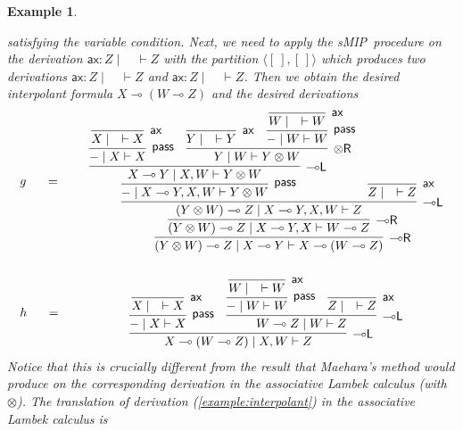 \documentclass[sn-mathphys-num]{sn-jnl}%
\newcommand{\vd}{\vdash}
\newcommand{\tr}{\otimes\mathsf{R}}
\newcommand{\pass}{\mathsf{pass}}
\newcommand{\ax}{\mathsf{ax}}
\newcommand{\ot}{\otimes}
\newcommand{\lolli}{\multimap}
\newcommand{\lleft}{{\lolli}\mathsf{L}}
\newcommand{\lright}{{\lolli}\mathsf{R}}
\newcommand{\sMIP}{\textsf{sMIP}}
\theoremstyle{thmstyleone}%
\theoremstyle{thmstyletwo}%
\newtheorem{example}[theorem]{Example}%
\theoremstyle{thmstylethree}%
\begin{document}
\begin{example}
\begin{itemize}
  \end{itemize}
  satisfying the variable condition.
  Next, we need to apply the \sMIP~procedure on the derivation $\ax : Z \mid \quad \vd Z$ with the partition $\langle [\ ] , [\ ] \rangle$ which produces two derivations $\ax : Z \mid \quad \vd Z$ and $\ax : Z \mid \quad \vd Z$.
  Then we obtain the desired interpolant formula $X \lolli (W \lolli Z)$ and the desired derivations 
  \begin{displaymath}
    \begin{array}{lc}
      \begin{array}{c}
        g
      \end{array}
      \quad
      =&
      \quad
      \begin{array}{c}
        \infer[\lright]{(Y \ot W) \lolli Z \mid X \lolli Y \vd X \lolli (W \lolli Z)}{
        \infer[\lright]{(Y \ot W) \lolli Z \mid X \lolli Y , X\vd W \lolli Z}{
        \infer[\lleft]{(Y \ot W) \lolli Z \mid X \lolli Y , X , W \vd Z}{
        \infer[\pass]{{-} \mid X \lolli Y , X , W\vd Y \ot W}{
        \infer[\lleft]{X \lolli Y \mid X , W \vd Y \ot W}{
        \infer[\pass]{{-} \mid X \vd X}{
        \infer[\ax]{X \mid \quad \vd X}{}
        }
        &
        \infer[\tr]{Y \mid W \vd Y \ot W}{
        \infer[\ax]{Y \mid \quad \vd Y}{}
        &
        \infer[\pass]{{-} \mid W \vd W}{
        \infer[\ax]{W \mid \quad \vd W}{}
        }
        }
        }
        }
        &
        \infer[\ax]{Z \mid \quad \vd Z}{}
        }
        }
        }
      \end{array}
      \\[2.5cm]
      \begin{array}{c}
        h
      \end{array}
      \quad
      =&
      \quad
      \begin{array}{c}
        \infer[\lleft]{X \lolli (W \lolli Z) \mid X, W \vd Z}{
        \infer[\pass]{{-} \mid X \vd X}{
        \infer[\ax]{X \mid \quad \vd X}{}
        }
        &
        \infer[\lleft]{W \lolli Z \mid W \vd Z}{
        \infer[\pass]{{-} \mid W \vd W}{
        \infer[\ax]{W \mid \quad \vd W}{}
        }
        &
        \infer[\ax]{Z \mid \quad \vd Z}{}
        }
        }
      \end{array}
    \end{array}
  \end{displaymath}
  Notice that this is crucially different from the result that Maehara's method would produce on the corresponding derivation in the associative Lambek calculus (with $\ot$). The translation of derivation (\ref{example:interpolant}) in the associative Lambek calculus is

\end{example}
\end{document}
